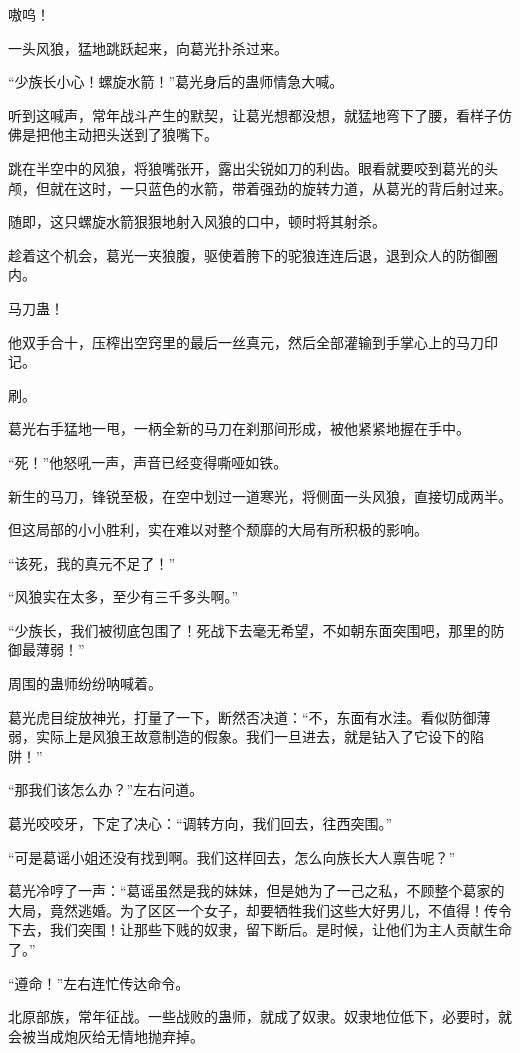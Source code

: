 \begin{this_body}
嗷呜！

一头风狼，猛地跳跃起来，向葛光扑杀过来。

“少族长小心！螺旋水箭！”葛光身后的蛊师情急大喊。

听到这喊声，常年战斗产生的默契，让葛光想都没想，就猛地弯下了腰，看样子仿佛是把他主动把头送到了狼嘴下。

跳在半空中的风狼，将狼嘴张开，露出尖锐如刀的利齿。眼看就要咬到葛光的头颅，但就在这时，一只蓝色的水箭，带着强劲的旋转力道，从葛光的背后射过来。

随即，这只螺旋水箭狠狠地射入风狼的口中，顿时将其射杀。

趁着这个机会，葛光一夹狼腹，驱使着胯下的驼狼连连后退，退到众人的防御圈内。

马刀蛊！

他双手合十，压榨出空窍里的最后一丝真元，然后全部灌输到手掌心上的马刀印记。

刷。

葛光右手猛地一甩，一柄全新的马刀在刹那间形成，被他紧紧地握在手中。

“死！”他怒吼一声，声音已经变得嘶哑如铁。

新生的马刀，锋锐至极，在空中划过一道寒光，将侧面一头风狼，直接切成两半。

但这局部的小小胜利，实在难以对整个颓靡的大局有所积极的影响。

“该死，我的真元不足了！”

“风狼实在太多，至少有三千多头啊。”

“少族长，我们被彻底包围了！死战下去毫无希望，不如朝东面突围吧，那里的防御最薄弱！”

周围的蛊师纷纷呐喊着。

葛光虎目绽放神光，打量了一下，断然否决道：“不，东面有水洼。看似防御薄弱，实际上是风狼王故意制造的假象。我们一旦进去，就是钻入了它设下的陷阱！”

“那我们该怎么办？”左右问道。

葛光咬咬牙，下定了决心：“调转方向，我们回去，往西突围。”

“可是葛谣小姐还没有找到啊。我们这样回去，怎么向族长大人禀告呢？”

葛光冷哼了一声：“葛谣虽然是我的妹妹，但是她为了一己之私，不顾整个葛家的大局，竟然逃婚。为了区区一个女子，却要牺牲我们这些大好男儿，不值得！传令下去，我们突围！让那些下贱的奴隶，留下断后。是时候，让他们为主人贡献生命了。”

“遵命！”左右连忙传达命令。

北原部族，常年征战。一些战败的蛊师，就成了奴隶。奴隶地位低下，必要时，就会被当成炮灰给无情地抛弃掉。


\end{this_body}
